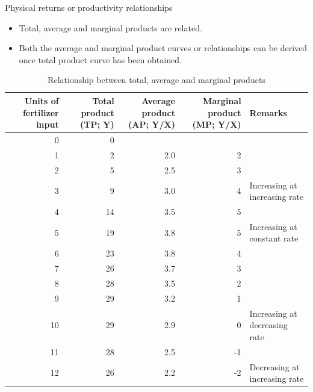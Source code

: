 \documentclass[12pt,ignorenonframetext,aspectratio=169]{beamer}
\providecommand{\tightlist}{%
  \setlength{\itemsep}{0pt}\setlength{\parskip}{0pt}}
\begin{document}
\begin{frame}{Physical returns or productivity relationships}
\protect\hypertarget{physical-returns-or-productivity-relationships}{}
\begin{itemize}
\tightlist
\item
  Total, average and marginal products are related.
\item
  Both the average and marginal product curves or relationships can be
  derived once total product curve has been obtained.
\end{itemize}
\end{frame}

\begin{frame}{}
\protect\hypertarget{section-7}{}
\begin{table}

\caption{\label{tab:tc-ac-mc-relationship}Relationship between total, average and marginal products}
\centering
\fontsize{6}{8}\selectfont
\begin{tabular}[t]{rrrrl}
\toprule
Units of fertilizer input & Total product (TP; Y) & Average product (AP; Y/X) & Marginal product (MP; Y/X) & Remarks\\
\midrule
\rowcolor{gray!6}  0 & 0 &  &  & \\

1 & 2 & 2.0 & 2 & \\

\rowcolor{gray!6}  2 & 5 & 2.5 & 3 & \\

3 & 9 & 3.0 & 4 & \multirow{-4}{*}{\raggedright\arraybackslash Increasing at increasing rate}\\
\cmidrule{1-5}
\rowcolor{gray!6}  4 & 14 & 3.5 & 5 & \\

5 & 19 & 3.8 & 5 & \multirow{-2}{*}{\raggedright\arraybackslash Increasing at constant rate}\\
\cmidrule{1-5}
\rowcolor{gray!6}  6 & 23 & 3.8 & 4 & \\

7 & 26 & 3.7 & 3 & \\

\rowcolor{gray!6}  8 & 28 & 3.5 & 2 & \\

9 & 29 & 3.2 & 1 & \\

\rowcolor{gray!6}  10 & 29 & 2.9 & 0 & \multirow{-5}{*}{\raggedright\arraybackslash Increasing at decreasing rate}\\
\cmidrule{1-5}
11 & 28 & 2.5 & -1 & \\

\rowcolor{gray!6}  12 & 26 & 2.2 & -2 & \multirow{-2}{*}{\raggedright\arraybackslash Decreasing at increasing rate}\\
\bottomrule
\end{tabular}
\end{table}
\end{frame}
\end{document}
